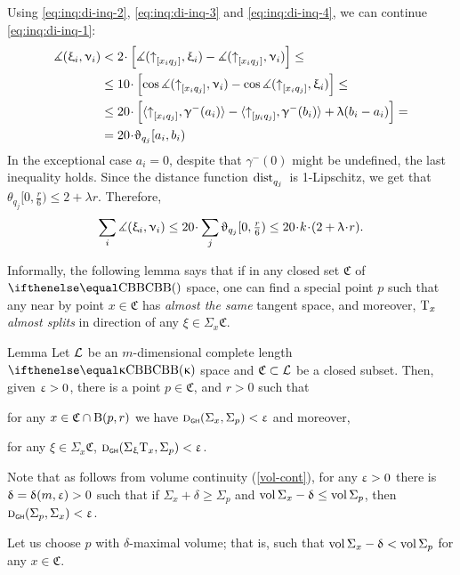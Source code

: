 Using \ref{eq:inq:di-inq-2}, \ref{eq:inq:di-inq-3} and \ref{eq:inq:di-inq-4}, we can continue \ref{eq:inq:di-inq-1}:
\begin{align*}
\mangle(\xi_i,\nu_i)
&<
2\cdot\left[\mangle(\dir{x_i}{q_j},\xi_i)-\mangle(\dir{x_i}{q_j},\nu_i)\right]
\le
\\
&\le 10\cdot\left[\cos\mangle(\dir{x_i}{q_j},\nu_i)-\cos\mangle(\dir{x_i}{q_j},\xi_i)\right]
\le
\\
&\le 20\cdot\left[\<\dir{x_i}{q_j},\gamma^-(a_i)\>-\<\dir{y_i}{q_j},\gamma^-(b_i)\>+\lambda (b_i-a_i)\right]
=
\\
&=20\cdot\theta_{q_j}[a_i,b_i)
\end{align*}
In the exceptional case $a_i=0$, despite that $\gamma^-(0)$ might be undefined, the last inequality holds.
Since the distance function $\mathop{\rm dist}\nolimits_{q_j}^{{}}{}{}$ is 1-Lipschitz, we get that $\theta_{q_j}[0,\tfrac{r}{6})\le 2+\lambda r$.
Therefore,
\[\sum_i\mangle(\xi_i,\nu_i)
\le 
20\cdot\sum_{j}\theta_{q_j}[0,\tfrac{r}{6})
\le 20\cdot \kay\cdot(2+\lambda\cdot r).\]
\qedqedsf

Informally, the following lemma says that if in any closed set $\mathfrak C$ of $\Alex{}$ space, one can find a special point $p$ such that any near by point $x\in\mathfrak C$ has \emph{almost the same} tangent space, and moreover, $\text{\rm T}_x$ \emph{almost splits} in direction of any $\xi\in\Sigma_x \mathfrak C$.

\begin{thm}{Lemma} \label{lem:amost=Sigma}
Let $\mathcal{L}$ be an $m$-dimensional complete length $\Alex{\kappa}$ space and $\mathfrak C\subset \spc{L}$ be a closed subset.
Then, given $\upvarepsilon>0$,
there is a point $p\in \mathfrak C$, and $r>0$ 
such that 
\begin{subthm}{}for any $x\in\mathfrak C\cap \oBall(p,r)$ we have
$\text{\sc d}_{\text{\sf\tiny GH}}(\Sigma_x,\Sigma_p)<\upvarepsilon$ and moreover,
\end{subthm}
\begin{subthm}{} for any $\xi\in\Sigma_x\mathfrak C$, $\text{\sc d}_{\text{\sf\tiny GH}}(\Sigma_\upxi\text{\rm T}_x,\Sigma_p)<\upvarepsilon$.
\end{subthm}
\end{thm}

Note that as follows from volume continuity (\ref{vol-cont}),
for any $\upvarepsilon>0$ there is $\updelta=\updelta(m,\upvarepsilon)>0$ such that if $\Sigma_x+\delta\ge\Sigma_p$ and $\vol\Sigma_x-\delta\le\vol\Sigma_p$, then
$\text{\sc d}_{\text{\sf\tiny GH}}(\Sigma_p,\Sigma_x)<\upvarepsilon$.

Let us choose $p$ with $\delta$-maximal volume;
that is, such that $\mathop{\rm vol}\nolimits\Sigma_x-\updelta<\mathop{\rm vol}\nolimits\Sigma_p$ for any $x\in \mathfrak C$.

